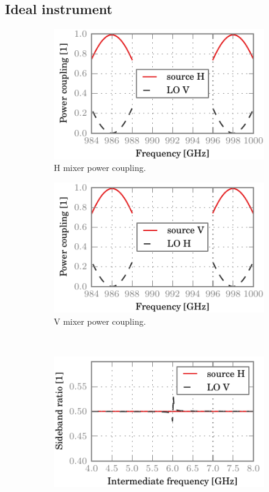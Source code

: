 \clearpage
\subsection{Ideal instrument}

\begin{figure}[hbtp]
    \centering
    \begin{subfigure}[b]{.5\textwidth}
        \includegraphics{chapter_3/0_ideal_h_dsb}%
        \caption{H mixer power coupling.}
    \end{subfigure}%
    \begin{subfigure}[b]{.5\textwidth}
        \includegraphics{chapter_3/0_ideal_v_dsb}%
        \caption{V mixer power coupling.}
    \end{subfigure}%
    \\
    \begin{subfigure}[b]{.5\textwidth}
        \includegraphics{chapter_3/0_ideal_h_sbr}%

\end{subfigure}
\end{figure}
